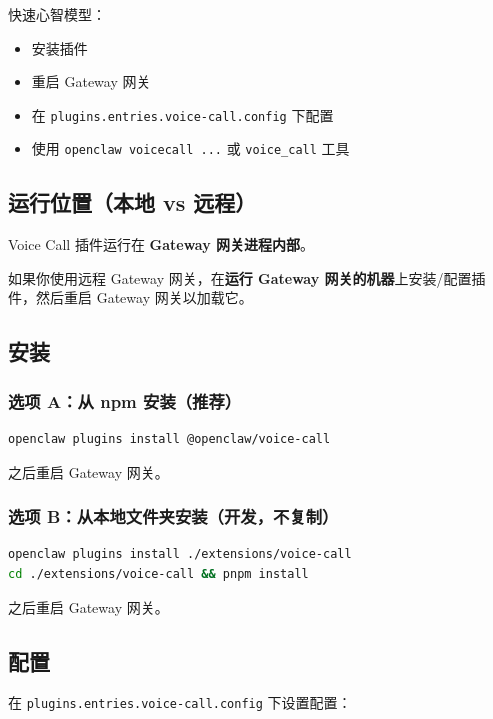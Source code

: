 快速心智模型：

\begin{itemize}
  \item 安装插件
  \item 重启 Gateway 网关
  \item 在 \texttt{plugins.entries.voice-call.config} 下配置
  \item 使用 \texttt{openclaw voicecall ...} 或 \texttt{voice\_call} 工具
\end{itemize}


\subsection{运行位置（本地 vs 远程）}


Voice Call 插件运行在 \textbf{Gateway 网关进程内部}。

如果你使用远程 Gateway 网关，在\textbf{运行 Gateway 网关的机器}上安装/配置插件，然后重启 Gateway 网关以加载它。

\subsection{安装}


\subsubsection{选项 A：从 npm 安装（推荐）}


\begin{lstlisting}[language=bash]
openclaw plugins install @openclaw/voice-call
\end{lstlisting}


之后重启 Gateway 网关。

\subsubsection{选项 B：从本地文件夹安装（开发，不复制）}


\begin{lstlisting}[language=bash]
openclaw plugins install ./extensions/voice-call
cd ./extensions/voice-call && pnpm install
\end{lstlisting}


之后重启 Gateway 网关。

\subsection{配置}


在 \texttt{plugins.entries.voice-call.config} 下设置配置：

